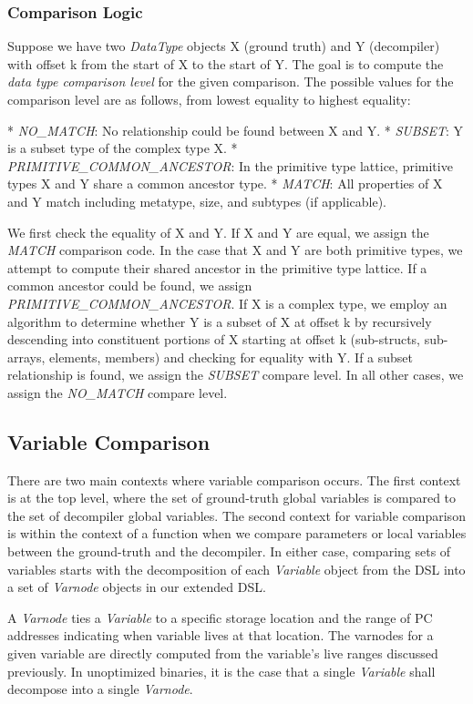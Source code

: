 \subsubsection{Comparison Logic}

Suppose we have two \emph{DataType} objects X (ground truth) and Y (decompiler) with offset k from the start of X to the start of Y. The goal is to compute the \emph{data type comparison level} for the given comparison. The possible values for the comparison level are as follows, from lowest equality to highest equality:

* \emph{NO\_MATCH}: No relationship could be found between X and Y.
* \emph{SUBSET}: Y is a subset type of the complex type X.
* \emph{PRIMITIVE\_COMMON\_ANCESTOR}: In the primitive type lattice, primitive types X and Y share a common ancestor type.
* \emph{MATCH}: All properties of X and Y match including metatype, size, and subtypes (if applicable).

We first check the equality of X and Y. If X and Y are equal, we assign the \emph{MATCH} comparison code. In the case that X and Y are both primitive types, we attempt to compute their shared ancestor in the primitive type lattice. If a common ancestor could be found, we assign \emph{PRIMITIVE\_COMMON\_ANCESTOR}. If X is a complex type, we employ an algorithm to determine whether Y is a subset of X at offset k by recursively descending into constituent portions of X starting at offset k (sub-structs, sub-arrays, elements, members) and checking for equality with Y. If a subset relationship is found, we assign the \emph{SUBSET} compare level. In all other cases, we assign the \emph{NO\_MATCH} compare level.

\subsection{Variable Comparison}

There are two main contexts where variable comparison occurs. The first context is at the top level, where the set of ground-truth global variables is compared to the set of decompiler global variables. The second context for variable comparison is within the context of a function when we compare parameters or local variables between the ground-truth and the decompiler. In either case, comparing sets of variables starts with the decomposition of each \emph{Variable} object from the DSL into a set of \emph{Varnode} objects in our extended DSL.

A \emph{Varnode} ties a \emph{Variable} to a specific storage location and the range of PC addresses indicating when variable lives at that location. The varnodes for a given variable are directly computed from the variable's live ranges discussed previously. In unoptimized binaries, it is the case that a single \emph{Variable} shall decompose into a single \emph{Varnode}.

